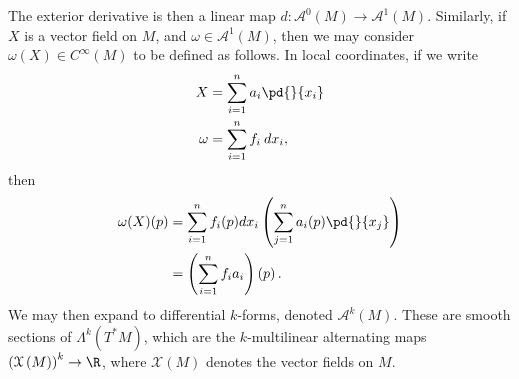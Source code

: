 \documentclass[10pt]{mypackage}
\begin{document}
The exterior derivative is then a linear map $d\colon \mathcal{A}^0\left( M \right)\rightarrow \mathcal{A}^1\left( M \right)$. Similarly, if $X$ is a vector field on $M$, and $ \omega \in \mathcal{A}^{1}\left( M \right) $, then we may consider $\omega\left( X \right)\in C^{\infty}\left( M \right)$ to be defined as follows. In local coordinates, if we write
\begin{align*}
  X &= \sum_{i=1}^{n} a_i \pd{}{x_i}\\
  \omega &= \sum_{i=1}^{n} f_i\:dx_i,
\end{align*}
then
\begin{align*}
  \omega(X)(p) &= \sum_{i=1}^{n}f_i(p)dx_i\left( \sum_{j=1}^{n} a_i(p) \pd{}{x_j} \right)\\
               &= \left( \sum_{i=1}^{n} f_ia_i \right)\left( p \right).
\end{align*}
We may then expand to differential $k$-forms, denoted $\mathcal{A}^{k}\left( M \right)$. These are smooth sections of $\Lambda^{k}\left( T^{\ast}M \right)$, which are the $k$-multilinear alternating maps $\left( \mathcal{X}\left( M \right) \right)^{k}\rightarrow \R$, where $ \mathcal{X}\left( M \right) $ denotes the vector fields on $ M $.\newline
\end{document}
